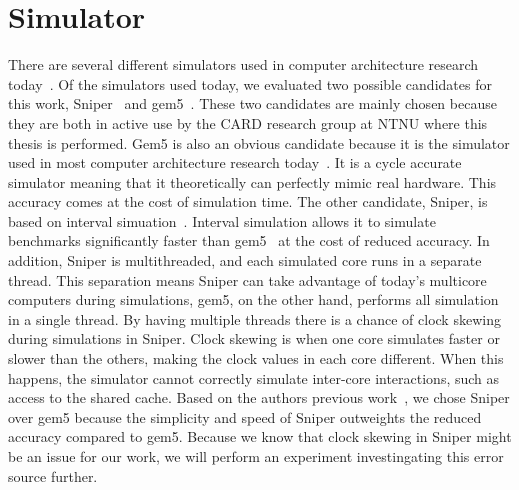 \section{Simulator}
\label{sec:methodology:simulator}

There are several different simulators used in computer architecture research today~\cite{Carlson2011a, Binkert2011, Miller2010, Pellauer2011}.
Of the simulators used today, we evaluated two possible candidates for this work, Sniper~\cite{Carlson2011a} and gem5~\cite{Binkert2011}.
These two candidates are mainly chosen because they are both in active use by the CARD research group at NTNU where this thesis is performed.
Gem5 is also an obvious candidate because it is the simulator used in most computer architecture research today~\cite{Chen-Han2014}.
It is a cycle accurate simulator meaning that it theoretically can perfectly mimic real hardware.
This accuracy comes at the cost of simulation time.
The other candidate, Sniper, is based on interval simuation~\cite{Genbrugge2010}. 
Interval simulation allows it to simulate benchmarks significantly faster than gem5~\cite{Carlson2011a, Olsen2014} at the cost of reduced accuracy.
In addition, Sniper is multithreaded, and each simulated core runs in a separate thread.
This separation means Sniper can take advantage of today's multicore computers during simulations, gem5, on the other hand, performs all simulation in a single thread.
By having multiple threads there is a chance of clock skewing~\cite{Carlson2011a} during simulations in Sniper.
Clock skewing is when one core simulates faster or slower than the others, making the clock values in each core different.
When this happens, the simulator cannot correctly simulate inter-core interactions, such as access to the shared cache.
Based on the authors previous work~\cite{Olsen2014}, we chose Sniper over gem5 because the simplicity and speed of Sniper outweights the reduced accuracy compared to gem5.
Because we know that clock skewing in Sniper might be an issue for our work, we will perform an experiment investingating this error source further.